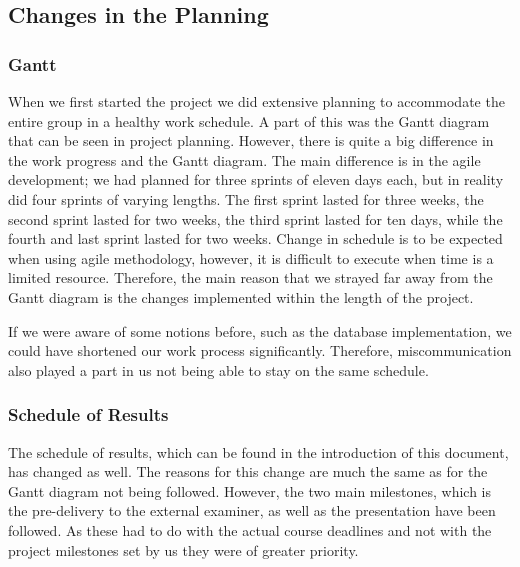\documentclass[../document.tex]{subfiles}
\begin{document}
\subsection{Changes in the Planning}

\subsubsection{Gantt}
When we first started the project we did extensive planning to accommodate the entire group in a healthy work schedule. A part of this was the Gantt diagram that can be seen in project planning. However, there is quite a big difference in the work progress and the Gantt diagram. The main difference is in the agile development; we had planned for three sprints of eleven days each, but in reality did four sprints of varying lengths. The first sprint lasted for three weeks, the second sprint lasted for two weeks, the third sprint lasted for ten days, while the fourth and last sprint lasted for two weeks. Change in schedule is to be expected when using agile methodology, however, it is difficult to execute when time is a limited resource. Therefore, the main reason that we strayed far away from the Gantt diagram is the changes implemented within the length of the project. 

If we were aware of some notions before, such as the database implementation, we could have shortened our work process significantly. Therefore, miscommunication also played a part in us not being able to stay on the same schedule.

\subsubsection{Schedule of Results}
The schedule of results, which can be found in the introduction of this document, has changed as well. The reasons for this change are much the same as for the Gantt diagram not being followed. However, the two main milestones, which is the pre-delivery to the external examiner, as well as the presentation have been followed. As these had to do with the actual course deadlines and not with the project milestones set by us they were of greater priority.
\end{document}
